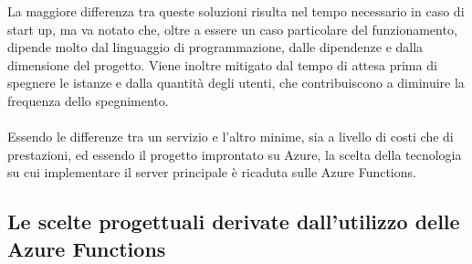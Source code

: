 La maggiore differenza tra queste soluzioni risulta nel tempo necessario in caso di start up,
ma va notato che, oltre a essere un caso particolare del funzionamento,
dipende molto dal linguaggio di programmazione,
dalle dipendenze e dalla dimensione del progetto.
Viene inoltre mitigato dal tempo di attesa prima di spegnere le istanze e
dalla quantità degli utenti, 
che contribuiscono a diminuire la frequenza dello spegnimento.\\
\\
Essendo le differenze tra un servizio e l'altro minime,
sia a livello di costi che di prestazioni, 
ed essendo il progetto improntato su Azure, 
la scelta della tecnologia su cui implementare il server principale è ricaduta sulle Azure Functions.\\

\subsection{Le scelte progettuali derivate dall'utilizzo delle Azure Functions}

